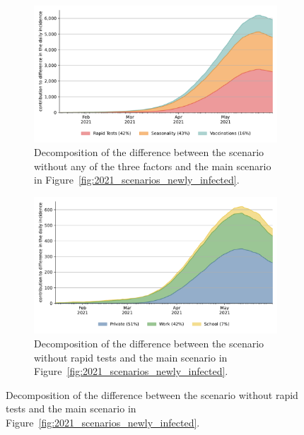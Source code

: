 \begin{figure}[!tp]
    \begin{subfigure}[b]{0.475\textwidth}
        \centering
        \includegraphics[width=\textwidth]{figures/results/figures/full_decomposition_channels_area}
        \caption{Decomposition of the difference between the scenario without any of the
            three factors and the main scenario in
            Figure~\ref{fig:2021_scenarios_newly_infected}.}
        \label{fig:2021_scenarios_decomposition}
    \end{subfigure}
    \hfill
    \begin{subfigure}[b]{0.475\textwidth}
        \centering
        \includegraphics[width=\textwidth]{figures/results/figures/full_decomposition_rapid_tests_area}
        \caption{Decomposition of the difference between the scenario without rapid
            tests and the main scenario in
            Figure~\ref{fig:2021_scenarios_newly_infected}.}
        \label{fig:2021_scenarios_decomposition_tests}
    \end{subfigure}


\end{figure}
